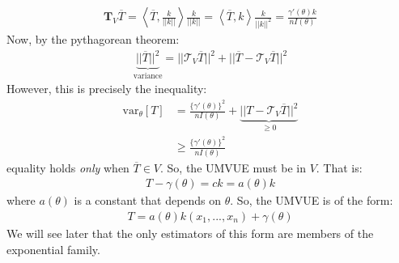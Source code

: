\documentclass[11pt]{scrartcl}
\theoremstyle{definition}
\theoremstyle{remark}
\begin{document}
{\begin{align*}
	\mathbf{T}_V \overline{T} = \left\langle \overline{T}, \frac{k}{|| k||} \right\rangle \frac{k}{|| k ||}	 =  \left\langle \overline{T}, k \right\rangle \frac{k}{|| k ||^2} = \frac{\gamma ' (\theta) k}{n I(\theta)}
\end{align*}
Now, by the pythagorean theorem: 
\begin{align*}
	\underbrace{|| \overline{T} ||^2}_{\text{variance}}= || \mathcal{T}_V \overline{T} ||^2 + || \overline{T} - \mathcal{T}_V \overline{T} ||^2	
\end{align*}
However, this is precisely the inequality: 
\begin{align*}
	\text{var}_\theta [T] & = \frac{\{ \gamma'(\theta) \}^2}{n I (\theta)} + \underbrace{|| T - \mathcal{T}_V \overline{T} ||^2 }_{\geq 0} \\
	& \geq \frac{\{ \gamma' (\theta) \}^2}{n I(\theta)}
\end{align*}
equality holds \emph{only} when $\overline{T} \in V$. So, the UMVUE must be in $V$. That is: 
\begin{align*}	
	T - \gamma (\theta)  = ck = a (\theta) k 	
\end{align*}
where $a(\theta)$ is a constant that depends on $\theta$. So, the UMVUE is of the form: 
\begin{align}
	T = a(\theta) k(x_1, ..., x_n) + \gamma (\theta ) 
\end{align}
We will see later that the only estimators of this form are members of the exponential family. 

}
\end{document}
